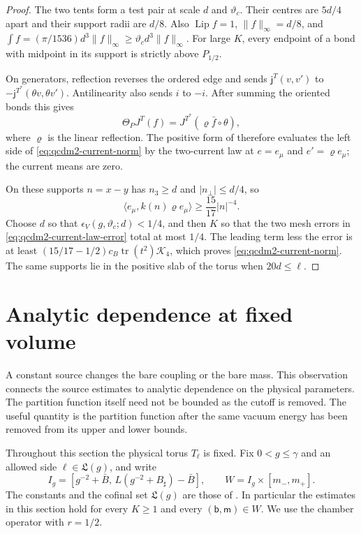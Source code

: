 \documentclass[11pt,letterpaper,reqno]{amsart}
\theoremstyle{definition}
\theoremstyle{remark}
\begin{document}
\begin{proof}
The two tents form a test pair at scale $d$ and
$\vartheta_c$.  Their centres are $5d/4$ apart and
their support radii are $d/8$.  Also
$\operatorname{Lip}f=1$, $\|f\|_\infty=d/8$, and
$\int f=(\pi/1536)d^3\|f\|_\infty
\ge\vartheta_cd^3\|f\|_\infty$.
For large $K$, every endpoint of a bond with midpoint
in its support is strictly above $P_{1/2}$.

On generators, reflection reverses the ordered edge
and sends $\mathsf j^T(v,v')$ to
$-\mathsf j^{T^*}(\theta v,\theta v')$.
Antilinearity also sends $i$ to $-i$.  After summing
the oriented bonds this gives
\begin{equation}\label{C-402-26}
 \Theta_PJ^T(f)=J^{T^*}(\varrho\bar f\circ\theta),
\end{equation}
where $\varrho$ is the linear reflection.  The positive
form of \cite[Thm. B and Thm. A]{QCDM1} therefore
evaluates the left side of \eqref{eq:qcdm2-current-norm}
by the two-current law at $e=e_\mu$ and
$e'=\varrho e_\mu$; the current means are zero.

On these supports $n=x-y$ has $n_3\ge d$ and
$|n_\perp|\le d/4$, so
\[
 \langle e_\mu,k(n)\varrho e_\mu\rangle
       \ge\frac{15}{17}|n|^{-4}.
\]
Choose $d$ so that $\epsilon_V(g,\vartheta_c;d)<1/4$,
and then $K$ so that the two mesh errors in
\eqref{eq:qcdm2-current-law-error} total at most $1/4$.
The leading term less the error is at least
$(15/17-1/2)c_B\operatorname{tr}(t^2)\mathcal K_4$,
which proves \eqref{eq:qcdm2-current-norm}.
The same supports lie in the positive slab of the
torus when $20d\le\ell$.
\end{proof}

\section{Analytic dependence at fixed volume}\label{sec:analytic-labels}

A constant source changes the bare coupling or the bare mass.
This observation connects the source estimates to analytic
dependence on the physical parameters. The partition function
itself need not be bounded as the cutoff is removed. The useful
quantity is the partition function after the same vacuum energy
has been removed from its upper and lower bounds.

Throughout this section the physical torus $T_\ell$ is fixed.
Fix $0<g\le\gamma$ and an allowed side $\ell\in\mathfrak L(g)$,
and write
\[
 I_g=[g^{-2}+\bar B,\,L(g^{-2}+B_\sharp)-\bar B],
 \qquad W=I_g\times[m_-,m_+].
\]
The constants and the cofinal set $\mathfrak L(g)$ are those of
\cite[Prop. 10.20]{QCDM1}. In particular the estimates in this section
hold for every $K\ge1$ and every $(\mathsf b,\mathsf m)\in W$.
We use the chamber operator with $r=1/2$.
\end{document}
